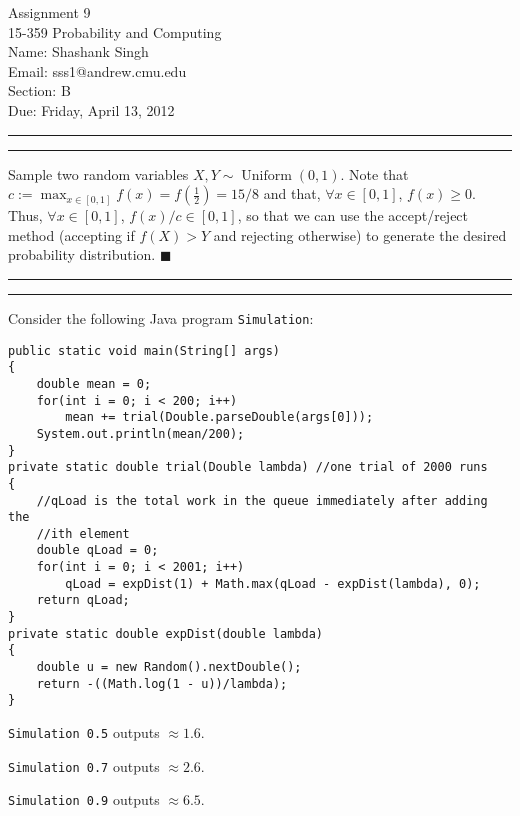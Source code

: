 \documentclass[11pt]{article}
\makeatletter
\newcounter{questionCounter}
\newcounter{partCounter}[questionCounter]
\newenvironment{question}[2][\arabic{questionCounter}]{%
    \setcounter{partCounter}{0}%
    \vspace{.25in} \hrule \vspace{0.5em}%
        \noindent{\bf #2}%
    \vspace{0.8em} \hrule \vspace{.10in}%
    \addtocounter{questionCounter}{1}%
}{}
\newcommand{\myname}{Shashank Singh}
\newcommand{\myandrew}{sss1@andrew.cmu.edu}
\newcommand{\myclass}{15-359 Probability and Computing}
\newcommand{\myhwnum}{9}
\newcommand{\mysection}{B}
\newcommand{\duedate}{Friday, April 13, 2012}
\makeatother
\begin{document}
\thispagestyle{plain}

{\Large Assignment \myhwnum} \\
\myclass \\
Name: \myname \\
Email: \myandrew \\
Section: \mysection \\
Due: \duedate

\begin{question}{Problem 4.1}
Sample two random variables $X,Y \sim \operatorname{Uniform}(0,1)$.
Note that $c := \max_{x \in [0,1]} f(x) = f\left(\frac12\right) = 15/8$
and that, $\forall x \in [0,1]$, $f(x) \geq 0$. Thus, $\forall x \in [0,1]$,
$f(x)/c \in [0,1]$, so that we can use the accept/reject method
(accepting if $f(X) > Y$ and rejecting otherwise) to generate the desired
probability distribution. \quad $\blacksquare$
\end{question}

\begin{question}{Problem 4.3}
Consider the following Java program \texttt{Simulation}:
\begin{verbatim}
public static void main(String[] args)
{
    double mean = 0;
    for(int i = 0; i < 200; i++)
        mean += trial(Double.parseDouble(args[0]));
    System.out.println(mean/200);
}
private static double trial(Double lambda) //one trial of 2000 runs
{
    //qLoad is the total work in the queue immediately after adding the
    //ith element
    double qLoad = 0;
    for(int i = 0; i < 2001; i++)
        qLoad = expDist(1) + Math.max(qLoad - expDist(lambda), 0);
    return qLoad;
}
private static double expDist(double lambda)
{
    double u = new Random().nextDouble();
    return -((Math.log(1 - u))/lambda);
}
\end{verbatim}
\texttt{Simulation 0.5} outputs $\approx 1.6$.

\texttt{Simulation 0.7} outputs $\approx 2.6$.

\texttt{Simulation 0.9} outputs $\approx 6.5$.
\end{question}
\end{document}

